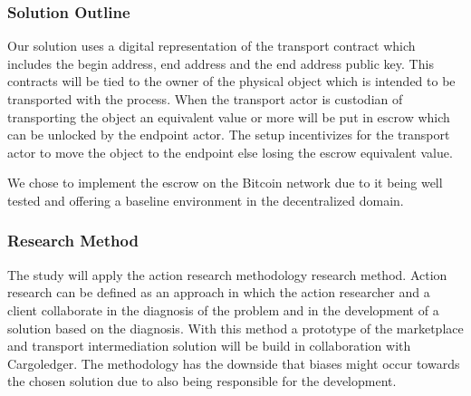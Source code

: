 
\subsubsection{Solution Outline}

Our solution uses a digital representation of the transport contract which includes the begin address, end address and the end address public key. This contracts will be tied to the owner of the physical object which is intended to be transported with the process. When the transport actor is custodian of transporting the object an equivalent value or more will be put in escrow which can be unlocked by the endpoint actor. The setup incentivizes for the transport actor to move the object to the endpoint else losing the escrow equivalent value. \par
We chose to implement the escrow on the Bitcoin network due to it being well tested and offering a baseline environment in the decentralized domain.

%

\subsubsection{Research Method}

The study will apply the action research methodology research method. Action research can be defined as an approach in which the action researcher and a client collaborate in the diagnosis of the problem and in the development of a solution based on the diagnosis. With this method a prototype of the marketplace and transport intermediation solution will be build in collaboration with Cargoledger. The methodology has the downside that biases might occur towards the chosen solution due to also being responsible for the development.\par

